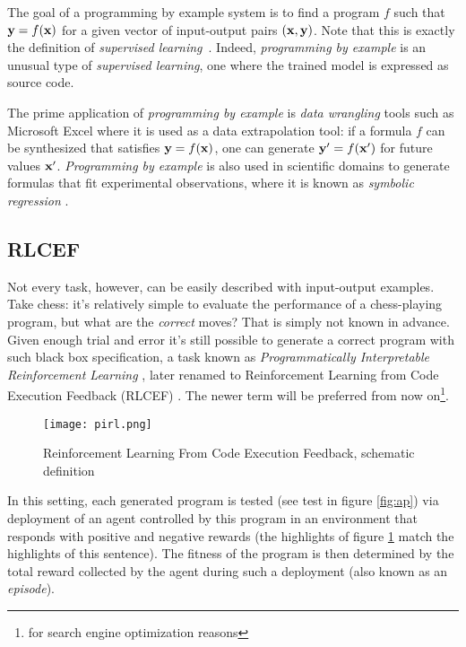 The goal of a programming by example system is to find a program $f$ such that $\mathbf{y}=f(\mathbf{x})$ for a given vector of input-output pairs $(\mathbf{x},\mathbf{y})$. 
Note that this is exactly the definition of \emph{supervised learning}~\cite{cunninghamSupervisedLearning2008}.
Indeed, \emph{programming by example} is an unusual type of \emph{supervised learning}, one where the trained model is expressed as source code.

The prime application of \emph{programming by example} is \emph{data wrangling} tools such as Microsoft Excel \cite{gulwani2016:programming} where it is used as a data extrapolation tool: if a formula $f$ can be synthesized that satisfies $\mathbf{y}=f(\mathbf{x})$, one can generate $\mathbf{y} '=f(\mathbf{x} ')$ for future values $\mathbf{x} '$.
\emph{Programming by example} is also used in scientific domains to generate formulas that fit experimental observations, where it is known as \emph{symbolic regression} \cite{makkeInterpretableScientificDiscovery2022}.

\subsection{RLCEF}
\label{sec:rlcef}

Not every task, however, can be easily described with input-output examples. 
Take chess: it's relatively simple to evaluate the performance of a chess-playing program, but what are the \emph{correct} moves? 
That is simply not known in advance.
Given enough trial and error it's still possible to generate a correct program with such black box specification, a task known as \emph{Programmatically Interpretable Reinforcement Learning} \cite{pirl}, later renamed to Reinforcement Learning from Code Execution Feedback (RLCEF) \cite{douStepCoderImproveCode2024, gehringRLEFGroundingCode2025, liuRLTFReinforcementLearning2023, warnerPoolsideAnnouncingOur, shojaeeExecutionbasedCodeGeneration2023, yangIntercodeStandardizingBenchmarking2023}.
The newer term will be preferred from now on\footnote{for search engine optimization reasons}.

\begin{figure}
    \centering
    \texttt{[image: pirl.png]}
    \caption{Reinforcement Learning From Code Execution Feedback, schematic definition}
    \label{fig:RLCEF}
\end{figure}

In this setting, each generated program is tested (see \textcolor{accent}{test} in figure \ref{fig:ap}) via deployment of an \textcolor{accent}{agent} controlled by this program in an environment that responds with positive and negative \textcolor{accent}{rewards} (the highlights of figure \ref{fig:RLCEF} match the highlights of this sentence).
The fitness of the program is then determined by the total reward collected by the agent during such a deployment (also known as an \emph{episode}).

